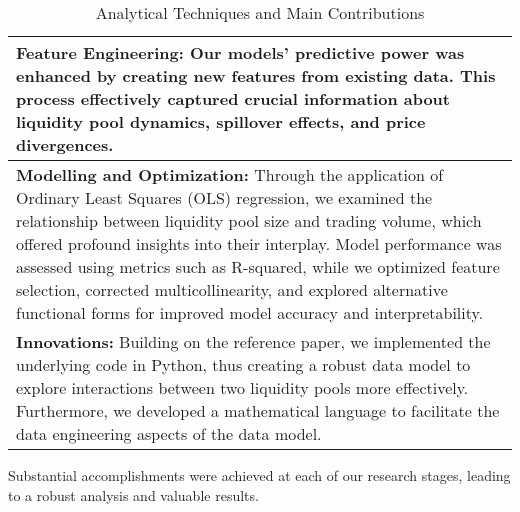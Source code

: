 \documentclass{article}
\begin{document}
\begin{table}[htbp]
  \centering
  \small
  \begin{tabularx}{\linewidth}{|>{\raggedright\arraybackslash}X|}
  \hline
  \textbf{Feature Engineering:} Our models' predictive power was enhanced by creating new features from existing data\cite{Miori2023}. This process effectively captured crucial information about liquidity pool dynamics, spillover effects, and price divergences. \\
  \hline
  \textbf{Modelling and Optimization:} Through the application of Ordinary Least Squares (OLS) regression, we examined the relationship between liquidity pool size and trading volume, which offered profound insights into their interplay\cite{Miori2023}. Model performance was assessed using metrics such as R-squared, while we optimized feature selection, corrected multicollinearity, and explored alternative functional forms for improved model accuracy and interpretability\cite{Miori2023}. \\
  \hline
  \textbf{Innovations:} Building on the reference paper, we implemented the underlying code in Python, thus creating a robust data model to explore interactions between two liquidity pools more effectively\cite{Miori2023}. Furthermore, we developed a mathematical language to facilitate the data engineering aspects of the data model\cite{Miori2023}. \\
  \hline
  \end{tabularx}
  \caption{Analytical Techniques and Main Contributions}
  \label{fig:analytical-techniques}
  \end{table}
  
  Substantial accomplishments were achieved at each of our research stages, leading to a robust analysis and valuable results\cite{Miori2023}.
\end{document}
